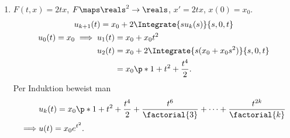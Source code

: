 \begin{beispiele*}
\begin{enumerate}
\begin{behauptung*}
\begin{align*}
         u_{2n+1}(t)=\begin{pNiceMatrix} 1-\frac{t^2}{2}+\dotsb+(-1)^n\frac{t^{2n}}{\factorial+{2n}} \\ t-\dotsb+(-1)n\frac{t^{2n+1}}{\factorial+{2n+1}} \end{pNiceMatrix}.
       \end{align*}
     \end{behauptung*}
     \begin{proof}
      per Induktion       
     \end{proof}
     \begin{equation*}
       \implies x(t)=\begin{pNiceMatrix} \Cos{t} \\ \Sin{t} \end{pNiceMatrix}
     \end{equation*}
     \item \( F(t,x)=2tx \), \( F\maps \reals^2\to \reals \), \( x'=2tx \), \( x(0)=x_0 \).
     \begin{gather*}
       u_{k+1}(t)=x_0+2\Integrate{su_k(s)}{s,0,t}\\
       u_0(t)=x_0\implies \begin{aligned}[t]
         u_1(t)&=x_0+x_0t^2\\
         u_2(t)&=x_0+2\Integrate{s(x_0+x_0s^2)}{s,0,t}\\
         &=x_0\p*{ 1+t^2+\frac{t^4}{2} }.
       \end{aligned}
     \end{gather*}
     Per Induktion beweist man
     \begin{align*}
       &u_k(t)=x_0\p*{ 1+t^2+\frac{t^4}{2}+\frac{t^6}{\factorial{3}}+\dotsb+\frac{t^{2k}}{\factorial{k}} }\\
       \implies &u(t)=x_0 e^{t^2}.
     \end{align*}
   \end{enumerate}
\end{beispiele*}
